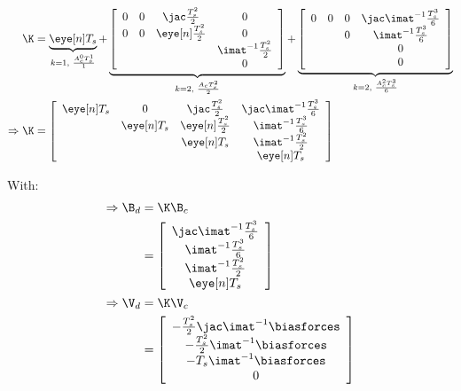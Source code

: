 \begin{align}
  \K &= \underbrace{\eye[ n ] T_s}_{k=1, \text{ }\frac{A_c^0 T_s^1}{1}} + \underbrace{\left[
       \begin{array}{cccc}
         0 & 0 & \jac \frac{T_s^2}{2} & 0 \\
         0 & 0 & \eye[ n ] \frac{T_s^2}{2} & 0 \\
           &&& \imat^{-1} \frac{T_s^2}{2} \\
           &&& 0
       \end{array}\right]}_{k=2, \text{ }\frac{A_c T_s^2}{2}} + \underbrace{\left[
               \begin{array}{cccc}
                 0 & 0 & 0 & \jac \imat^{-1} \frac{T_s^3}{6} \\
                   & & 0 & \imat^{-1} \frac{T_s^3}{6} \\
                   &&& 0 \\
                   &&& 0
               \end{array}\right]}_{k=2,\text{ }\frac{A_c^2 T_s^3}{6}} \\
  \Rightarrow \K &= \left[
                   \begin{array}{cccc}
                     \eye[ n ]T_s & 0 & \jac \frac{T_s^2}{2} & \jac \imat^{-1} \frac{T_s^3}{6} \\
                                & \eye[ n ]T_s & \eye[ n ] \frac{T_s^2}{2} & \imat^{-1} \frac{T_s^3}{6} \\
                                &&\eye[ n ]T_s& \imat^{-1} \frac{T_s^2}{2} \\
                                &&& \eye[ n ]T_s
                   \end{array}\right]
\end{align}

With:
\begin{align}
  \Rightarrow \B_d&= \K \B_c \\
                  &= \left[
                    \begin{array}{c}
                      \jac \imat^{-1} \frac{T_s^3}{6} \\
                      \imat^{-1} \frac{T_s^3}{6} \\
                      \imat^{-1} \frac{T_s^2}{2} \\
                      \eye[ n ]T_s
                    \end{array}\right] \\
  \Rightarrow \V_d&= \K \V_c \\
                  &= \left[
                    \begin{array}{c}
                      -\frac{T_s^2}{2} \jac \imat^{-1}\biasforces \\
                      -\frac{T_s^2}{2} \imat^{-1}\biasforces \\
                      -T_s \imat^{-1}\biasforces \\
                      0
                    \end{array}\right] \\
\end{align}


